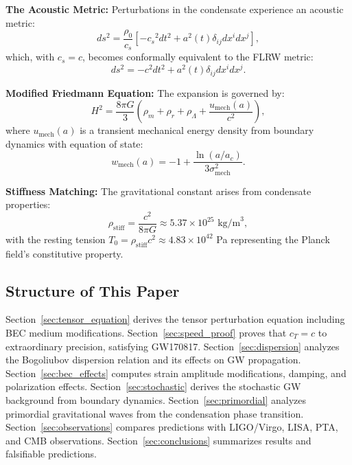 \documentclass[11pt,a4paper]{article}
\newcommand{\rhostiff}{\ensuremath{\rho_{\mathrm{stiff}}}}
\newcommand{\Tzero}{\ensuremath{T_0}}
\newcommand{\cs}{\ensuremath{c_s}}
\newcommand{\cT}{\ensuremath{c_T}}
\newcommand{\umech}{\ensuremath{u_{\mathrm{mech}}}}
\newcommand{\wmech}{\ensuremath{w_{\mathrm{mech}}}}
\theoremstyle{definition}
\theoremstyle{remark}
\begin{document}
\textbf{The Acoustic Metric:} Perturbations in the condensate experience an acoustic metric:
\begin{equation}
\label{eq:acoustic_metric}
ds^2 = \frac{\rho_0}{\cs}\left[-\cs^2 dt^2 + a^2(t)\delta_{ij}dx^i dx^j\right],
\end{equation}
which, with $\cs = c$, becomes conformally equivalent to the FLRW metric:
\begin{equation}
\label{eq:flrw_metric}
ds^2 = -c^2 dt^2 + a^2(t)\delta_{ij}dx^i dx^j.
\end{equation}

\textbf{Modified Friedmann Equation:} The expansion is governed by:
\begin{equation}
\label{eq:friedmann_modified}
H^2 = \frac{8\pi G}{3}\left(\rho_m + \rho_r + \rho_\Lambda + \frac{\umech(a)}{c^2}\right),
\end{equation}
where $\umech(a)$ is a transient mechanical energy density from boundary dynamics with equation of state:
\begin{equation}
\label{eq:wmech}
\wmech(a) = -1 + \frac{\ln(a/a_c)}{3\sigma_{\mathrm{mech}}^2}.
\end{equation}

\textbf{Stiffness Matching:} The gravitational constant arises from condensate properties:
\begin{equation}
\label{eq:stiffness_matching}
\rhostiff = \frac{c^2}{8\pi G} \approx 5.37 \times 10^{25} \text{ kg/m}^3,
\end{equation}
with the resting tension $\Tzero = \rhostiff c^2 \approx 4.83 \times 10^{42}$ Pa representing the Planck field's constitutive property.

\subsection{Structure of This Paper}
\label{sec:structure}

Section~\ref{sec:tensor_equation} derives the tensor perturbation equation including BEC medium modifications. Section~\ref{sec:speed_proof} proves that $\cT = c$ to extraordinary precision, satisfying GW170817. Section~\ref{sec:dispersion} analyzes the Bogoliubov dispersion relation and its effects on GW propagation. Section~\ref{sec:bec_effects} computes strain amplitude modifications, damping, and polarization effects. Section~\ref{sec:stochastic} derives the stochastic GW background from boundary dynamics. Section~\ref{sec:primordial} analyzes primordial gravitational waves from the condensation phase transition. Section~\ref{sec:observations} compares predictions with LIGO/Virgo, LISA, PTA, and CMB observations. Section~\ref{sec:conclusions} summarizes results and falsifiable predictions.
\end{document}
